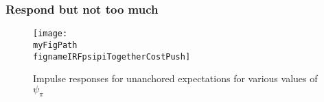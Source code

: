 \documentclass[10pt]{beamer}
\def \myFigPath {../../../figures/}
\newcommand{\backupend}{
   \addtocounter{framenumberappendix}{-\value{framenumber}}
   \addtocounter{framenumber}{\value{framenumberappendix}} 
}
\def\fignameIRFpsipiSmall{RIR_unanch_psi_pi1_01_command_IRFs_approx_pretty_2020_10_15}
\def\fignameIRFpsipiMedium{RIR_unanch_psi_pi1_5_command_IRFs_approx_pretty_2020_10_15}
\def\fignameIRFpsipiBig{RIR_unanch_psi_pi2_command_IRFs_approx_pretty_2020_10_15}
\def\fignameIRFpsipiTogetherCostPush{RIR_together_psi_pi2_command_IRFs_approx_pretty_together_2020_10_25}
\begin{document}
\begin{frame}[plain]  %
	\frametitle{Respond but not too much}\label{IRFs_function_psipi}

\begin{figure}[h!]
\texttt{[image: \\myFigPath \\fignameIRFpsipiTogetherCostPush]}
\caption{Impulse responses for unanchored expectations for various values of $\psi_{\pi}$}
\label{IRF_unanchored_psi}
\end{figure}

\vfill
\hyperlink{pos_feedback}{}	


\end{frame}



%
%
%

\backupend
\end{document}
